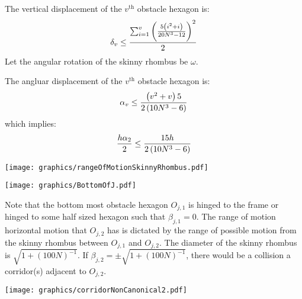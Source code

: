 The vertical displacement of the $v^\text{th}$ obstacle hexagon is:
$$\delta_v \leq \frac{\sum_{i=1}^v  \left(  \frac{5\left( i^2+i \right)}{20N^3-12} \right)^2}{2}$$
Let the angular rotation of the skinny rhombus be $\omega$.  

The angluar displacement of the $v^\text{th}$ obstacle hexagon is:
$$\alpha_v \leq \frac{\left( v^2 + v \right)5}{2\left( 10N^3-6 \right)}$$
which implies:
$$\frac{h\alpha_2 }{2} \leq \frac{15h}{2\left( 10N^3-6 \right)}$$


\begin{minipage}{\linewidth}
\begin{center}
\texttt{[image: graphics/rangeOfMotionSkinnyRhombus.pdf]}
\label{fig:rangeOfMotionSkinnyRhombus.pdf}
\end{center}
\end{minipage}

\begin{minipage}{\linewidth}
\begin{center}
\texttt{[image: graphics/BottomOfJ.pdf]}
\label{fig:BottomOfJ.pdf}
\end{center}
\end{minipage}

Note that the bottom most obstacle hexagon $O_{j,1}$ is hinged to the frame or hinged to some half sized hexagon such that $\beta_{j,1} = 0$.  
The range of motion horizontal motion that $O_{j,2}$ has is dictated by the range of possible motion from the skinny rhombus between $O_{j,1}$ and $O_{j,2}$.
The diameter of the skinny rhombus is $\sqrt{1+(100N)^{-1}}$.  
If $\beta_{j,2} = \pm \sqrt{1+(100N)^{-1}}$, there would be a collision a  corridor(s) adjacent to $O_{j,2}$.  

\begin{minipage}{\linewidth}
\begin{center}
\texttt{[image: graphics/corridorNonCanonical2.pdf]}
\label{fig:corridorNonCanonical2.pdf}
\end{center}
\end{minipage}

